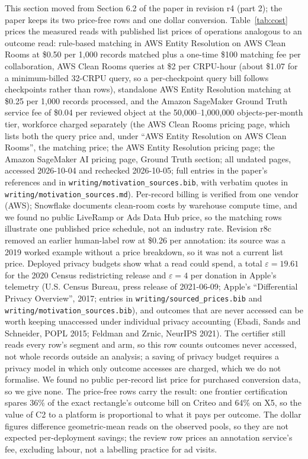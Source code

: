 \documentclass[sigconf,anonymous,review]{acmart}
\newcommand{\eps}{\varepsilon}
\begin{document}
This section moved from Section 6.2 of the paper in revision r4 (part 2); the paper keeps its two price-free rows and one dollar conversion. Table~\ref{tab:cost} prices the measured reads with published list prices of operations analogous to an outcome read: rule-based matching in AWS Entity Resolution on AWS Clean Rooms at \$0.50 per 1,000 records matched plus a one-time \$100 matching fee per collaboration, AWS Clean Rooms queries at \$2 per CRPU-hour (about \$1.07 for a minimum-billed 32-CRPU query, so a per-checkpoint query bill follows checkpoints rather than rows), standalone AWS Entity Resolution matching at \$0.25 per 1,000 records processed, and the Amazon SageMaker Ground Truth service fee of \$0.04 per reviewed object at the 50,000--1,000,000 objects-per-month tier, workforce charged separately (the AWS Clean Rooms pricing page, which lists both the query price and, under ``AWS Entity Resolution on AWS Clean Rooms'', the matching price; the AWS Entity Resolution pricing page; the Amazon SageMaker AI pricing page, Ground Truth section; all undated pages, accessed 2026-10-04 and rechecked 2026-10-05; full entries in the paper's references and in \texttt{writing/motivation\_sources.bib}, with verbatim quotes in \texttt{writing/motivation\_sources.md}). Per-record billing is verified from one vendor (AWS); Snowflake documents clean-room costs by warehouse compute time, and we found no public LiveRamp or Ads Data Hub price, so the matching rows illustrate one published price schedule, not an industry rate. Revision r8c removed an earlier human-label row at \$0.26 per annotation: its source was a 2019 worked example without a price breakdown, so it was not a current list price. Deployed privacy budgets show what a read could spend, a total $\eps = 19.61$ for the 2020 Census redistricting release and $\eps = 4$ per donation in Apple's telemetry (U.S. Census Bureau, press release of 2021-06-09; Apple's ``Differential Privacy Overview'', 2017; entries in \texttt{writing/sourced\_prices.bib} and \texttt{writing/motivation\_sources.bib}), and outcomes that are never accessed can be worth keeping unaccessed under individual privacy accounting (Ebadi, Sands and Schneider, POPL 2015; Feldman and Zrnic, NeurIPS 2021). The certifier still reads every row's segment and arm, so this row counts outcomes never accessed, not whole records outside an analysis; a saving of privacy budget requires a privacy model in which only outcome accesses are charged, which we do not formalise. We found no public per-record list price for purchased conversion data, so we give none. The price-free rows carry the result: one frontier certification spares 36\% of the exact rectangle's outcome bill on Criteo and 64\% on X5, so the value of C2 to a platform is proportional to what it pays per outcome. The dollar figures difference geometric-mean reads on the observed pools, so they are not expected per-deployment savings; the review row prices an annotation service's fee, excluding labour, not a labelling practice for ad visits.
\end{document}
